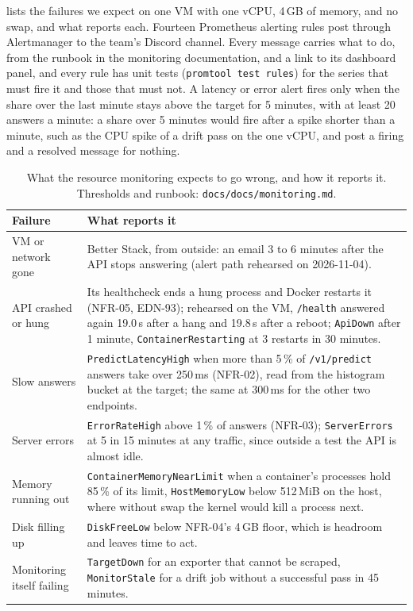  lists the failures we expect on one VM with one vCPU, 4\,GB of memory, and no swap, and what reports each.
Fourteen Prometheus alerting rules post through Alertmanager to the team's Discord channel.
Every message carries what to do, from the runbook in the monitoring documentation, and a link to its dashboard panel, and every rule has unit tests (\texttt{promtool test rules}) for the series that must fire it and those that must not.
A latency or error alert fires only when the share over the last minute stays above the target for 5 minutes, with at least 20 answers a minute: a share over 5 minutes would fire after a spike shorter than a minute, such as the CPU spike of a drift pass on the one vCPU, and post a firing and a resolved message for nothing.

\begin{table}[ht]
  \centering\small
  \begin{tabularx}{\textwidth}{@{}>{\raggedright\arraybackslash}p{3.3cm}X@{}}
    \toprule
    Failure & What reports it \\
    \midrule
    VM or network gone & Better Stack, from outside: an email 3 to 6 minutes after the API stops answering (alert path rehearsed on 2026-11-04). \\
    API crashed or hung & Its healthcheck ends a hung process and Docker restarts it (NFR-05, EDN-93); rehearsed on the VM, \texttt{/health} answered again 19.0\,s after a hang and 19.8\,s after a reboot; \texttt{ApiDown} after 1 minute, \texttt{ContainerRestarting} at 3 restarts in 30 minutes. \\
    Slow answers & \texttt{PredictLatencyHigh} when more than 5\,\% of \texttt{/v1/predict} answers take over 250\,ms (NFR-02), read from the histogram bucket at the target; the same at 300\,ms for the other two endpoints. \\
    Server errors & \texttt{ErrorRateHigh} above 1\,\% of answers (NFR-03); \texttt{ServerErrors} at 5 in 15 minutes at any traffic, since outside a test the API is almost idle. \\
    Memory running out & \texttt{ContainerMemoryNearLimit} when a container's processes hold 85\,\% of its limit, \texttt{HostMemoryLow} below 512\,MiB on the host, where without swap the kernel would kill a process next. \\
    Disk filling up & \texttt{DiskFreeLow} below NFR-04's 4\,GB floor, which is headroom and leaves time to act. \\
    Monitoring itself failing & \texttt{TargetDown} for an exporter that cannot be scraped, \texttt{MonitorStale} for a drift job without a successful pass in 45 minutes. \\
    \bottomrule
  \end{tabularx}
  \caption{What the resource monitoring expects to go wrong, and how it reports it. Thresholds and runbook: \texttt{docs/docs/monitoring.md}.}
  \label{tab:m6-risks}
\end{table}

